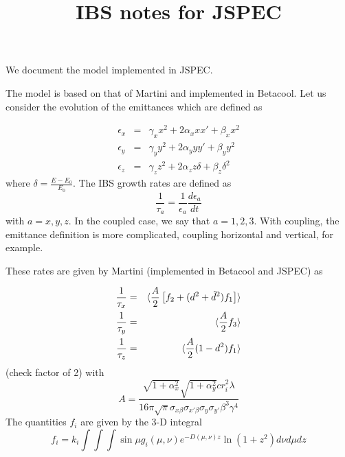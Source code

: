 \documentclass[acus]{article}
\begin{document}
\title{IBS notes for JSPEC}
\maketitle

We document the model implemented in JSPEC.

The model is based on that of Martini and implemented in Betacool.
Let us consider the evolution of the emittances which are defined as

\begin{eqnarray}
\epsilon_x &=& \gamma_x x^2 + 2\alpha_x x x' + \beta_x x^2 \\
\epsilon_y &=& \gamma_y y^2 + 2\alpha_y y y' + \beta_y y^2 \\
\epsilon_z &=& \gamma_z z^2 + 2\alpha_z z \delta + \beta_z \delta^2
\end{eqnarray}
where $\delta = \frac{E-E_0}{E_0}$.  The IBS growth rates are defined as
\begin{equation}
\frac{1}{\tau_{a}} = \frac{1}{\epsilon_{a}}\frac{d\epsilon_{a}}{dt}
\end{equation}
with $a=x,y,z$.  In the coupled case, we say that $a=1,2,3$.  With coupling, the emittance definition is
more complicated, coupling horizontal and vertical, for example.

These rates are given by Martini (implemented in Betacool and JSPEC) as

\begin{eqnarray}
\frac{1}{\tau_x} &=& {\langle \frac{A}{2}\left[f_2 + (d^2 + \tilde{d}^2)f_1\right]\rangle} \\
\frac{1}{\tau_y} &=& {\langle \frac{A}{2} f_3\rangle} \\
\frac{1}{\tau_z} &=& {\langle \frac{A}{2}(1-d^2)f_1\rangle}
\end{eqnarray}
(check factor of 2) with
\begin{equation}
A=\frac{\sqrt{1+\alpha_x^2}\sqrt{1+\alpha_y^2}c r_i^2 \lambda}{16\pi\sqrt{\pi}\sigma_{x\beta}\sigma_{x'\beta}\sigma_y\sigma_{y'}\beta^3\gamma^4}
\end{equation}
The quantities $f_i$ are given by the 3-D integral
\begin{equation}
f_i = k_i\int\int\int \sin\mu g_i(\mu,\nu) e^{-D(\mu,\nu)z}\ln(1+z^2) d\nu d\mu dz
\end{equation} 


\begin{thebibliography}{3}
\end{thebibliography}
\end{document}
